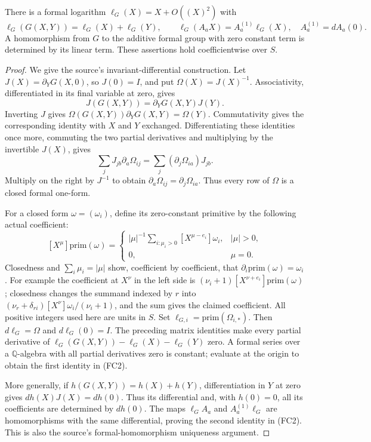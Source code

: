 \begin{srlemma}
\label{lem:sr-source-normalized-formal-log}
There is a formal logarithm \(\ell_G(X)=X+O((X)^2)\) with
\[
 \ell_G(G(X,Y))=\ell_G(X)+\ell_G(Y),\qquad
 \ell_G(A_aX)=A_a^{(1)}\ell_G(X),\quad A_a^{(1)}=dA_a(0).
 \tag{FC2}
\]
A homomorphism from \(G\) to the additive formal group
with zero constant term is determined by its linear term.
These assertions hold coefficientwise over \(S\).
\end{srlemma}
\begin{proof}
We give the source's invariant-differential construction.
Let \(J(X)=\partial_YG(X,0)\), so \(J(0)=I\), and put
\(\Omega(X)=J(X)^{-1}\).
Associativity, differentiated in its final variable at
zero, gives
\[
 J(G(X,Y))=\partial_YG(X,Y)J(Y).
\]
Inverting \(J\) gives
\(\Omega(G(X,Y))\partial_YG(X,Y)=\Omega(Y)\).
Commutativity gives the corresponding identity with
\(X\) and \(Y\) exchanged.
Differentiating these identities once more, commuting
the two partial derivatives and multiplying by the
invertible \(J(X)\), gives
\[
 \sum_jJ_{jb}\partial_a\Omega_{ij}
       =\sum_j(\partial_j\Omega_{ia})J_{jb}.
\]
Multiply on the right by \(J^{-1}\) to obtain
\(\partial_a\Omega_{ij}=\partial_j\Omega_{ia}\).
Thus every row of \(\Omega\) is a closed formal one-form.

For a closed form \(\omega=(\omega_i)\), define its
zero-constant primitive by the following actual coefficient:
\[
 [X^\mu]\mathrm{prim}(\omega)=
 \begin{cases}
 |\mu|^{-1}\displaystyle\sum_{i:\mu_i>0}
                    [X^{\mu-e_i}]\omega_i,&|\mu|>0,\\
 0,&\mu=0.
 \end{cases}                                                   \tag{FC3}
\]
Closedness and \(\sum_i\mu_i=|\mu|\) show, coefficient
by coefficient, that
\(\partial_i\mathrm{prim}(\omega)=\omega_i\).
For example the coefficient at \(X^\nu\) in the left
side is \((\nu_i+1)[X^{\nu+e_i}]\mathrm{prim}(\omega)\);
closedness changes the summand indexed by \(r\) into
\((\nu_r+\delta_{ri})[X^\nu]\omega_i/(\nu_i+1)\),
and the sum gives the claimed coefficient.
All positive integers used here are units in \(S\).
Set \(\ell_{G,i}=\mathrm{prim}(\Omega_{i,*})\).
Then \(d\ell_G=\Omega\) and \(d\ell_G(0)=I\).
The preceding matrix identities make every partial
derivative of
\(\ell_G(G(X,Y))-\ell_G(X)-\ell_G(Y)\) zero.
A formal series over a \(\mathbb Q\)-algebra with all
partial derivatives zero is constant; evaluate at the
origin to obtain the first identity in (FC2).

More generally, if \(h(G(X,Y))=h(X)+h(Y)\), differentiation
in \(Y\) at zero gives
\(dh(X)J(X)=dh(0)\).
Thus its differential and, with \(h(0)=0\), all its
coefficients are determined by \(dh(0)\).
The maps \(\ell_GA_a\) and \(A_a^{(1)}\ell_G\) are
homomorphisms with the same differential, proving the
second identity in (FC2).
This is also the source's formal-homomorphism uniqueness
argument.
\end{proof}


